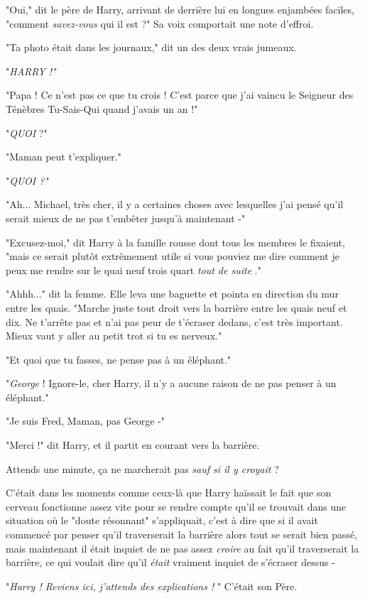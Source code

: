 "Oui," dit le père de Harry, arrivant de derrière lui en longues enjambées faciles, "comment \emph{savez-vous}  qui il est ?" Sa voix comportait une note d'effroi.

"Ta photo était dans les journaux," dit un des deux vrais jumeaux.

"\emph{HARRY !"} 

"Papa ! Ce n'est pas ce que tu crois ! C'est parce que j'ai vaincu le Seigneur des Ténèbres Tu-Sais-Qui quand j'avais un an !"

"\emph{QUOI } ?"

"Maman peut t'expliquer."

"\emph{QUOI ?"} 

"Ah... Michael, très cher, il y a certaines choses avec lesquelles j'ai pensé qu'il serait mieux de ne pas t'embêter jusqu'à maintenant -"

"Excusez-moi," dit Harry à la famille rousse dont tous les membres le fixaient, "mais ce serait plutôt extrêmement utile si vous pouviez me dire comment je peux me rendre sur le quai neuf trois quart \emph{tout de suite} ."

"Ahhh..." dit la femme. Elle leva une baguette et pointa en direction du mur entre les quais. "Marche juste tout droit vers la barrière entre les quais neuf et dix. Ne t'arrête pas et n'ai pas peur de t'écraser dedans, c'est très important. Mieux vaut y aller au petit trot si tu es nerveux."

"Et quoi que tu fasses, ne pense pas à un éléphant."

"\emph{George}  ! Ignore-le, cher Harry, il n'y a aucune raison de ne pas penser à un éléphant."

"Je suis Fred, Maman, pas George -"

"Merci !" dit Harry, et il partit en courant vers la barrière.

Attends une minute, ça ne marcherait pas \emph{sauf si il y croyait}  ?

C'était dans les moments comme ceux-là que Harry haïssait le fait que son cerveau fonctionne assez vite pour se rendre compte qu'il se trouvait dans une situation où le "doute résonnant" s'appliquait, c'est à dire que si il avait commencé par penser qu'il traverserait la barrière alors tout se serait bien passé, mais maintenant il était inquiet de ne pas assez \emph{croire}  au fait qu'il traverserait la barrière, ce qui voulait dire qu'il \emph{était}  vraiment inquiet de s'écraser dessus -

"\emph{Harry ! Reviens ici, j'attends des explications !} " C'était son Père.

